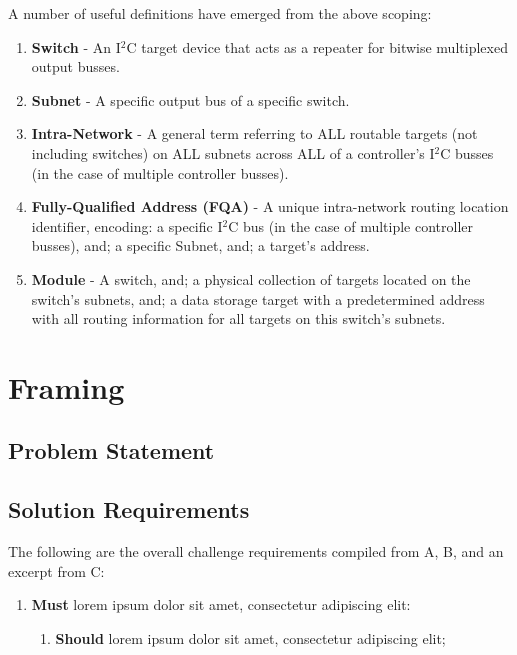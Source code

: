 \documentclass{../tex/report}
\begin{document}
A number of useful definitions have emerged from the above scoping:
\begin{enumerate}
    \item \textbf{Switch} - An I${}^2$C target device that acts as a repeater for bitwise multiplexed output busses.
    \item \textbf{Subnet} - A specific output bus of a specific switch.
    \item \textbf{Intra-Network} - A general term referring to ALL routable targets (not including switches) on ALL subnets across ALL of a controller's I${}^2$C busses (in the case of multiple controller busses).
    \item \textbf{Fully-Qualified Address (FQA)} - A unique intra-network routing location identifier, encoding: a specific I${}^2$C bus (in the case of multiple controller busses), and; a specific Subnet, and; a target's address.
    \item \textbf{Module} - A switch, and; a physical collection of targets located on the switch's subnets, and; a data storage target with a predetermined address with all routing information for all targets on this switch's subnets.
\end{enumerate}

\clearpage


\section{Framing}\label{sec:framing}

\subsection{Problem Statement}\label{sec:opportunity}



\subsection{Solution Requirements}\label{sec:requirements}






The following are the overall challenge requirements compiled from A, B, and an excerpt from C:
\begin{enumerate}[label=R\arabic*., ref=R\arabic*]
    \item\label{r:1} \textbf{Must} lorem ipsum dolor sit amet, consectetur adipiscing elit:
    \begin{enumerate}[ref=R1\alph*]
        \item\label{r:1a} \textbf{Should} lorem ipsum dolor sit amet, consectetur adipiscing elit;
    \end{enumerate}
\end{enumerate}
\end{document}
